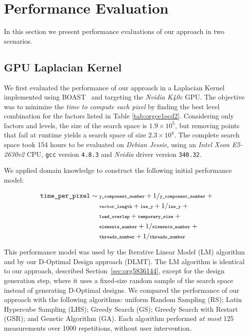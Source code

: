 \documentclass[conference]{IEEEtran}
\begin{document}
\section{Performance Evaluation}
\label{sec:orgc0c0b6f}
In this section we present performance evaluations of our approach in two
scenarios.
\vspace{-5pt}
\subsection{GPU Laplacian Kernel}
\label{sec:orga108e24}
We first evaluated the performance of our approach in a Laplacian Kernel
implemented using BOAST~\cite{videau2017boast} and targeting the \emph{Nvidia
K40c} GPU. The objective was to minimize the \emph{time to compute each pixel} by
finding the best level combination for the factors listed in Table
\ref{tab:orgce1ecd2}. Considering only factors and levels, the size of the
search space is \(1.9\times10^5\), but removing points that fail at runtime yields
a search space of size \(2.3\times10^4\). The complete search space took 154 hours
to be evaluated on \emph{Debian Jessie}, using an \emph{Intel Xeon E5-2630v2} CPU,
\texttt{gcc} version \texttt{4.8.3} and \emph{Nvidia} driver version \texttt{340.32}.

We applied domain knowledge to construct the following initial performance model:
\vspace{-2pt}
\\\begin{minipage}{\linewidth}\scriptsize
\begin{align}
\label{eq:gpu_laplacian_performance_model}
\texttt{time\_per\_pixel} \sim & \scriptsize\; \texttt{y\_component\_number} + 1 / \texttt{y\_component\_number} \; + \nonumber \\
& \scriptsize\; \texttt{vector\_length} + \texttt{lws\_y} + 1 / \texttt{lws\_y} \; + \nonumber \\
& \scriptsize\; \texttt{load\_overlap} + \texttt{temporary\_size} \; + \\
& \scriptsize\; \texttt{elements\_number} + 1 / \texttt{elements\_number} \; + \nonumber \\
& \scriptsize\; \texttt{threads\_number} + 1 /\texttt{threads\_number} \nonumber
\end{align}
\vspace{2pt}
\end{minipage}
This performance model was used by the Iterative Linear Model (LM) algorithm and
by our D-Optimal Design approach (DLMT). The LM algorithm is identical to our
approach, described Section~\ref{sec:org5836144}, except
for the design generation step, where it uses a fixed-size random sample of the
search space instead of generating D-Optimal designs. We compared the
performance of our approach with the following algorithms: uniform Random
Sampling (RS); Latin Hypercube Sampling (LHS); Greedy Search (GS); Greedy Search
with Restart (GSR); and Genetic Algorithm (GA). Each algorithm performed \emph{at
most} 125 measurements over 1000 repetitions, without user intervention.
\end{document}
